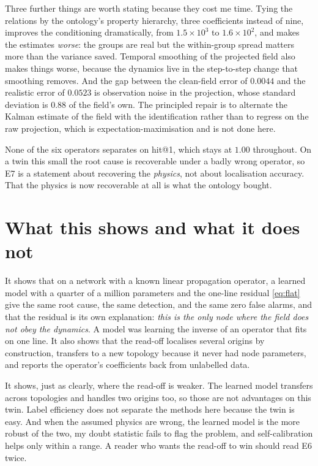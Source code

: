 \documentclass[11pt,a4paper]{article}
\begin{document}
Three further things are worth stating because they cost me time. Tying the relations by the
ontology's property hierarchy, three coefficients instead of nine, improves the conditioning
dramatically, from $1.5\times10^{3}$ to $1.6\times10^{2}$, and makes the estimates
\emph{worse}: the groups are real but the within-group spread matters more than the variance
saved. Temporal smoothing of the projected field also makes things worse, because the dynamics
live in the step-to-step change that smoothing removes. And the gap between the clean-field
error of $0.0044$ and the realistic error of $0.0523$ is observation noise in the projection,
whose standard deviation is $0.88$ of the field's own. The principled repair is to alternate the
Kalman estimate of the field with the identification rather than to regress on the raw
projection, which is expectation-maximisation and is not done here.

None of the six operators separates on hit@1, which stays at $1.00$ throughout. On a twin this
small the root cause is recoverable under a badly wrong operator, so E7 is a statement about
recovering the \emph{physics}, not about localisation accuracy. That the physics is now
recoverable at all is what the ontology bought.

\section{What this shows and what it does not}
It shows that on a network with a known linear propagation operator, a learned model with a quarter
of a million parameters and the one-line residual \eqref{eq:flat} give the same root cause, the
same detection, and the same zero false alarms, and that the residual is its own explanation:
\emph{this is the only node where the field does not obey the dynamics}. A model was learning the
inverse of an operator that fits on one line. It also shows that the read-off localises several
origins by construction, transfers to a new topology because it never had node parameters, and
reports the operator's coefficients back from unlabelled data.

It shows, just as clearly, where the read-off is weaker. The learned model transfers across
topologies and handles two origins too, so those are not advantages on this twin. Label efficiency
does not separate the methods here because the twin is easy. And when the assumed physics are
wrong, the learned model is the more robust of the two, my doubt statistic fails to flag the
problem, and self-calibration helps only within a range. A reader who wants the read-off to win
should read E6 twice.
\end{document}
